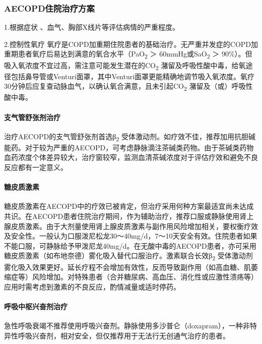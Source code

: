 \subsubsection{AECOPD住院治疗方案}

1.根据症状 、血气、胸部X线片等评估病情的严重程度。

2.控制性氧疗
氧疗是COPD加重期住院患者的基础治疗。无严重并发症的COPD加重期患者氧疗后易达到满意的氧合水平（PaO\textsubscript{2}
＞ 60mmHg或SaO\textsubscript{2} ＞
90\%）。但吸入氧浓度不宜过高，需注意可能发生潜在的CO\textsubscript{2}
潴留及呼吸性酸中毒，给氧途径包括鼻导管或Venturi面罩，其中Venturi面罩更能精确地调节吸入氧浓度。氧疗30分钟后应复查动脉血气，以确认氧合满意，且未引起CO\textsubscript{2}
潴留及（或）呼吸性酸中毒。

\paragraph{支气管舒张剂治疗}

治疗AECOPD的支气管舒张剂首选β\textsubscript{2}
受体激动剂。如疗效不佳，推荐加用抗胆碱能药。对于较为严重的AECOPD，可考虑静脉滴注茶碱类药物。由于茶碱类药物血药浓度个体差异较大，治疗窗较窄，监测血清茶碱浓度对于评估疗效和避免不良反应都有一定意义。

\paragraph{糖皮质激素}

糖皮质激素在AECOPD中的疗效已被肯定，但治疗采用何种方案最适宜尚未达成共识。在AECOPD患者住院治疗期间，作为辅助治疗，推荐口服或静脉使用肾上腺皮质激素。由于大剂量使用肾上腺皮质激素与副作用风险增加相关，要权衡疗效及安全性。一般认为口服泼尼松龙30～40mg/d，7～10天安全有效。住院患者如果不能口服，可静脉给予甲泼尼龙40mg/d。在无酸中毒的AECOPD患者，亦可采用糖皮质激素（如布地奈德）雾化吸入替代口服治疗。激素联合长效β\textsubscript{2}
受体激动剂雾化吸入效果更好。延长疗程不会增加有效性，反而导致副作用（如高血糖、肌萎缩症等）风险增加。对特殊患者（合并糖尿病、高血压、消化性或应激性溃疡等）应用时需考虑到激素的不良反应，酌情减量或适时停药。

\paragraph{呼吸中枢兴奋剂治疗}

急性呼吸衰竭不推荐使用呼吸兴奋剂。静脉使用多沙普仑（doxapram），一种非特异性呼吸兴奋剂，相对安全，但仅推荐用于无法行无创通气治疗的患者。

